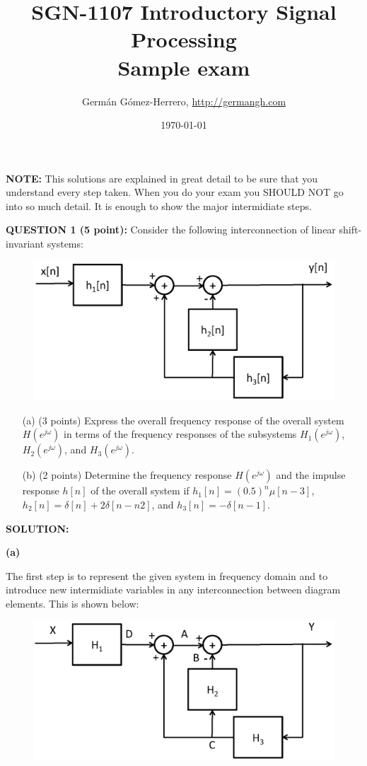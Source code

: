 \documentclass[a4paper,11pt,oneside]{article}
\title{SGN-1107 Introductory Signal Processing\\
Sample exam}
\author{Germ\'an G\'omez-Herrero, \url{http://germangh.com}}
\date{\today}
\begin{document}
\maketitle


\textbf{NOTE:} This solutions are explained in great detail to be sure that you understand every step taken. When you do your exam you SHOULD NOT go into so much detail. It is enough to show the major intermidiate steps.

\vspace{1cm}

\textbf{QUESTION 1 (5 point):} Consider the following interconnection of linear shift-invariant systems:

\begin{figure}[h!]
\centering
\includegraphics[width=.8\textwidth]{fig1.eps}
\end{figure}

\begin{itemize}
\item[(a)] (3 points) Express the overall frequency response of the overall system $H(e^{j\omega})$ in terms of the frequency responses of the subsystems $H_1(e^{j\omega})$, $H_2(e^{j\omega})$, and $H_3(e^{j\omega})$.

\item[(b)] (2 points) Determine the frequency response $H(e^{j\omega})$ and the impulse response $h[n]$ of the overall system if $h_1[n]=(0.5)^{n}\mu[n-3]$, $h_2[n]=\delta[n]+2\delta[n-n2]$, and $h_3[n]=-\delta[n-1]$.
\end{itemize}

\vspace{1cm}

\textbf{SOLUTION:}

\textbf{(a)}

The first step is to represent the given system in frequency domain and to introduce new intermidiate variables in any interconnection between diagram elements. This is shown below:


\begin{figure}[h!]
\centering
\includegraphics[width=.8\textwidth]{fig2.eps}
\end{figure}
\end{document}

